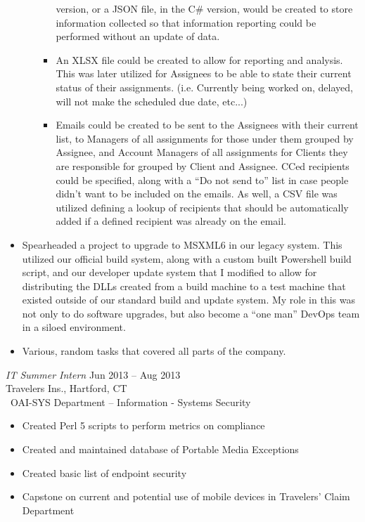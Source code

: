 \documentclass[margin]{res}
\begin{document}
\begin{resume}
\begin{itemize}
\begin{itemize}
\begin{itemize}
                     version, or a JSON file, in the C\# version, would be created to store information 
                     collected so that information reporting could be performed without an update of data.
                  \item An XLSX file could be created to allow for reporting and analysis. This was later
                     utilized for Assignees to be able to state their current status of their assignments.
                     (i.e. Currently being worked on, delayed, will not make the scheduled due date, 
                     etc...)
                  \item Emails could be created to be sent to the Assignees with their current list, to
                     Managers of all assignments for those under them grouped by Assignee, and Account
                     Managers of all assignments for Clients they are responsible for grouped by Client 
                     and Assignee. CCed recipients could be specified, along with a ``Do not send to'' 
                     list in case people didn't want to be included on the emails. As well, a CSV file 
                     was utilized defining a lookup of recipients that should be automatically added if
                     a defined recipient was already on the email.
               \end{itemize}
         \end{itemize}
      \item Spearheaded a project to upgrade to MSXML6 in our legacy system. This utilized our official
         build system, along with a custom built Powershell build script, and our developer update system
         that I modified to allow for distributing the DLLs created from a build machine to a test machine
         that existed outside
         of our standard build and update system. My role in this was not only to do software upgrades, 
         but also become a ``one man'' DevOps team in a siloed environment.
      \item Various, random tasks that covered all parts of the company.
   \end{itemize}

   {\sl IT Summer Intern} \hfill Jun 2013 -- Aug 2013 \\
   Travelers Ins., Hartford, CT\\\
   OAI-SYS Department -- Information - Systems Security
   \begin{itemize}  %
      \item Created Perl 5 scripts to perform metrics on
         compliance
      \item Created and maintained database of Portable
         Media Exceptions
      \item Created basic list of endpoint security
      \item Capstone on current and potential use of mobile
         devices in Travelers' Claim Department
   \end{itemize}


\end{resume}
\end{document}
